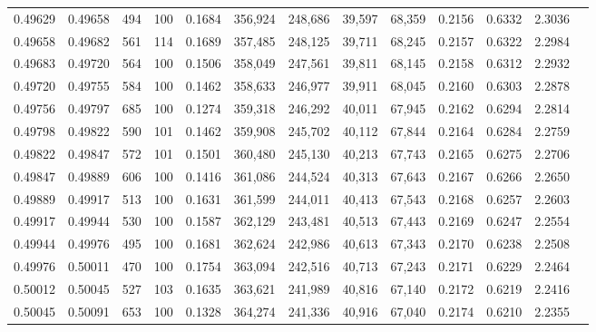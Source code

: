 \begin{tabular}{rrrrrrrrrrrrr}
0.49629 & 0.49658 &   494 & 100 &                                     0.1684 & 356,924 & 248,686 &  39,597 &  68,359 & 0.2156 & 0.6332 & 2.3036 \\
0.49658 & 0.49682 &   561 & 114 &                                     0.1689 & 357,485 & 248,125 &  39,711 &  68,245 & 0.2157 & 0.6322 & 2.2984 \\
0.49683 & 0.49720 &   564 & 100 &                                     0.1506 & 358,049 & 247,561 &  39,811 &  68,145 & 0.2158 & 0.6312 & 2.2932 \\
0.49720 & 0.49755 &   584 & 100 &                                     0.1462 & 358,633 & 246,977 &  39,911 &  68,045 & 0.2160 & 0.6303 & 2.2878 \\
0.49756 & 0.49797 &   685 & 100 &                                     0.1274 & 359,318 & 246,292 &  40,011 &  67,945 & 0.2162 & 0.6294 & 2.2814 \\
0.49798 & 0.49822 &   590 & 101 &                                     0.1462 & 359,908 & 245,702 &  40,112 &  67,844 & 0.2164 & 0.6284 & 2.2759 \\
0.49822 & 0.49847 &   572 & 101 &                                     0.1501 & 360,480 & 245,130 &  40,213 &  67,743 & 0.2165 & 0.6275 & 2.2706 \\
0.49847 & 0.49889 &   606 & 100 &                                     0.1416 & 361,086 & 244,524 &  40,313 &  67,643 & 0.2167 & 0.6266 & 2.2650 \\
0.49889 & 0.49917 &   513 & 100 &                                     0.1631 & 361,599 & 244,011 &  40,413 &  67,543 & 0.2168 & 0.6257 & 2.2603 \\
0.49917 & 0.49944 &   530 & 100 &                                     0.1587 & 362,129 & 243,481 &  40,513 &  67,443 & 0.2169 & 0.6247 & 2.2554 \\
0.49944 & 0.49976 &   495 & 100 &                                     0.1681 & 362,624 & 242,986 &  40,613 &  67,343 & 0.2170 & 0.6238 & 2.2508 \\
0.49976 & 0.50011 &   470 & 100 &                                     0.1754 & 363,094 & 242,516 &  40,713 &  67,243 & 0.2171 & 0.6229 & 2.2464 \\
0.50012 & 0.50045 &   527 & 103 &                                     0.1635 & 363,621 & 241,989 &  40,816 &  67,140 & 0.2172 & 0.6219 & 2.2416 \\
0.50045 & 0.50091 &   653 & 100 &                                     0.1328 & 364,274 & 241,336 &  40,916 &  67,040 & 0.2174 & 0.6210 & 2.2355 \\

\end{tabular}
